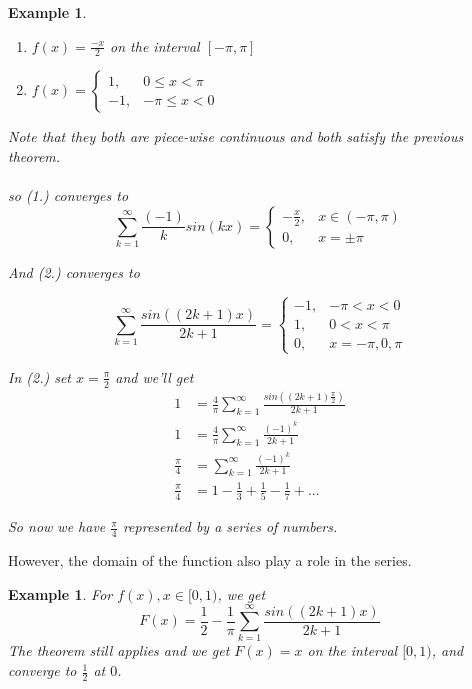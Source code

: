 \documentclass[12pt]{article}
\theoremstyle{plain}
\newtheorem{example}[theorem]{Example}
\theoremstyle{definition}
\begin{document}
\begin{example}
	\begin{enumerate}
		\item $f(x) = \frac{-x}{2}$ on the interval $[-\pi, \pi]$
		\item $f(x) = \begin{cases}
			1, &0\leq x < \pi\\
			-1, &-\pi\leq x < 0
		\end{cases}
$
	\end{enumerate}
	Note that they both are piece-wise continuous and both satisfy the previous theorem.\\
	\\
	so (1.) converges to
	$$\sum^\infty_{k=1} \frac{(-1)}{k} sin(kx) = \begin{cases}
		-\frac{x}{2}, &x\in (-\pi, \pi)\\
		0, &x = \pm \pi
	\end{cases}
$$

And (2.) converges to

$$\sum^\infty_{k=1} \frac{sin((2k+1)x)}{2k+1} = \begin{cases}
		-1, &-\pi < x < 0\\
		1, &0 < x < \pi\\
		0, &x = -\pi, 0,\pi
	\end{cases}
$$

In (2.) set $x = \frac{\pi}{2}$ and we'll get
\begin{align*}
	1 &= \frac{4}{\pi}\sum^\infty_{k=1} \frac{sin((2k+1)\frac{\pi}{2})}{2k+1}\\
	1 &=\frac{4}{\pi}\sum^\infty_{k=1} \frac{(-1)^k}{2k+1}\\
	\frac{\pi}{4}&= \sum^\infty_{k=1} \frac{(-1)^k}{2k+1}\\
	\frac{\pi}{4}&=1-\frac{1}{3}+\frac{1}{5}-\frac{1}{7}+...
\end{align*}

So now we have $\frac{\pi}{4}$ represented by a series of numbers.

\end{example}

However, the domain of the function also play a role in the series.

\begin{example}
	For $f(x), x\in[0,1)$, we get
	$$F(x) = \frac{1}{2} - \frac{1}{\pi}\sum^\infty_{k=1} \frac{sin((2k+1)x)}{2k+1}$$
	The theorem still applies and we get $F(x) = x$ on the interval $[0,1)$, and converge to $\frac{1}{2}$ at $0$.
\end{example}
\end{document}
